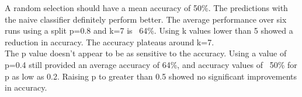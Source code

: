
A random selection should have a mean accuracy of 50\%. The predictions with the naive classifier definitely perform better. The average performance over six runs using a split p=0.8 and k=7 is ~64\%. Using k values lower than 5 showed a reduction in accuracy. The accuracy plateaus around k=7.\\
The p value doesn't appear to be as sensitive to the accuracy. Using a value of p=0.4 still provided an average accuracy of 64\%, and accuracy values of ~50\% for p as low as 0.2. Raising p to greater than 0.5 showed no significant improvements in accuracy.

